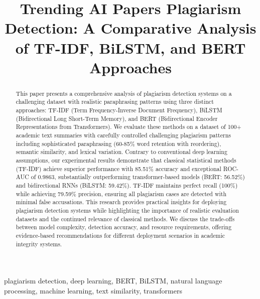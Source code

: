 \documentclass[conference]{IEEEtran}
\title{Trending AI Papers Plagiarism Detection: A Comparative Analysis of TF-IDF, BiLSTM, and BERT Approaches}
\author{
  \IEEEauthorblockN{Anonymous Author}
  \IEEEauthorblockA{
    Department of Computer Science\\
    Research Institution\\
    City, Country\\
    Email: author@institution.edu
  }
}
\begin{document}
\maketitle

\begin{abstract}
This paper presents a comprehensive analysis of plagiarism detection systems on a challenging dataset with realistic paraphrasing patterns using three distinct approaches: TF-IDF (Term Frequency-Inverse Document Frequency), BiLSTM (Bidirectional Long Short-Term Memory), and BERT (Bidirectional Encoder Representations from Transformers). We evaluate these methods on a dataset of 100+ academic text summaries with carefully controlled challenging plagiarism patterns including sophisticated paraphrasing (60-85\% word retention with reordering), semantic similarity, and lexical variation. Contrary to conventional deep learning assumptions, our experimental results demonstrate that classical statistical methods (TF-IDF) achieve superior performance with 85.51\% accuracy and exceptional ROC-AUC of 0.9863, substantially outperforming transformer-based models (BERT: 56.52\%) and bidirectional RNNs (BiLSTM: 59.42\%). TF-IDF maintains perfect recall (100\%) while achieving 79.59\% precision, ensuring all plagiarism cases are detected with minimal false accusations. This research provides practical insights for deploying plagiarism detection systems while highlighting the importance of realistic evaluation datasets and the continued relevance of classical methods. We discuss the trade-offs between model complexity, detection accuracy, and resource requirements, offering evidence-based recommendations for different deployment scenarios in academic integrity systems.
\end{abstract}

\begin{IEEEkeywords}
plagiarism detection, deep learning, BERT, BiLSTM, natural language processing, machine learning, text similarity, transformers
\end{IEEEkeywords}


\end{document}
